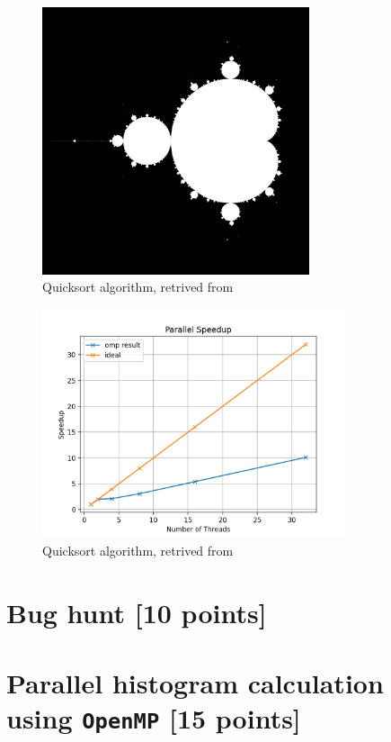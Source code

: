 \documentclass[unicode,11pt,a4paper,oneside,numbers=endperiod,openany]{scrartcl}
\begin{document}
\begin{figure}[H]
  \centering
  \includegraphics[width=0.7\textwidth]{Images_Output/mandel.png}
  \caption{Quicksort algorithm, retrived from \cite{parallelized_quicksort}}
  \label{fig:quicksort}
\end{figure}
\begin{figure}[H]
  \centering
  \includegraphics[width=0.8\textwidth]{Images_Output/mandel_speedup.png}
  \caption{Quicksort algorithm, retrived from \cite{parallelized_quicksort}}
  \label{fig:quicksort}
\end{figure}

\section{Bug hunt [10 points]}

\section{Parallel histogram calculation using \texttt{OpenMP} [15 points]}
\end{document}
